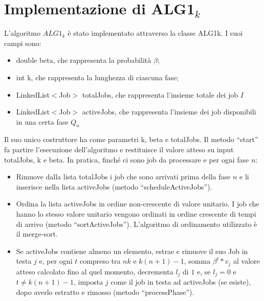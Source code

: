 \documentclass[twoside,openany,titlepage,fleqn,
	headinclude,12pt,a4paper,BCOR5mm,footinclude]{scrbook}
\begin{document}
\section{Implementazione di ALG1$_{k}$}
L’algoritmo $ALG1_{k}$ è stato implementato attraverso la classe ALG1k. I suoi campi sono:
\begin{itemize}
\item{double beta, che rappresenta la probabilità $\beta$;}
\item{int k, che rappresenta la lunghezza di ciascuna fase;}
\item{LinkedList$<$Job$>$ totalJobs, che rappresenta l’insieme totale dei job $I$}
\item{LinkedList$<$Job$>$ activeJobs, che rappresenta l’insieme dei job disponibili in una certa fase $Q_{n}$}
\end{itemize}
Il suo unico costruttore ha come parametri k, beta e totalJobs. Il metodo “start” fa partire l’esecuzione dell’algoritmo e restituisce il valore atteso su input totalJobs, k e beta. In pratica, finché ci sono job da processare e per ogni fase $n$:
\begin{itemize}
\item{Rimuove dalla lista totalJobs i job che sono arrivati prima della fase $n$ e li inserisce nella lista activeJobs (metodo “scheduleActiveJobs”).}
\item{Ordina la lista activeJobs in ordine non-crescente di valore unitario. I job che hanno lo stesso valore unitario  vengono ordinati in ordine crescente di tempi di arrivo (metodo “sortActiveJobs”). L’algoritmo di ordinamento utilizzato è il merge-sort.}
\item{Se activeJobs contiene almeno un elemento, estrae e rimuove il suo Job in testa $j$  e, per ogni $t$ compreso tra $nk$ e $k(n + 1) - 1$, somma $\beta^{t} * v_{j}$ al valore atteso calcolato fino al quel momento, decrementa $l_{j}$ di $1$ e, se $l_{j} = 0$ e $t \neq k(n + 1) - 1$, imposta $j$ come il job in testa ad activeJobs (se esiste), dopo averlo estratto e rimosso (metodo “processPhase”).}
\end{itemize}
\end{document}
